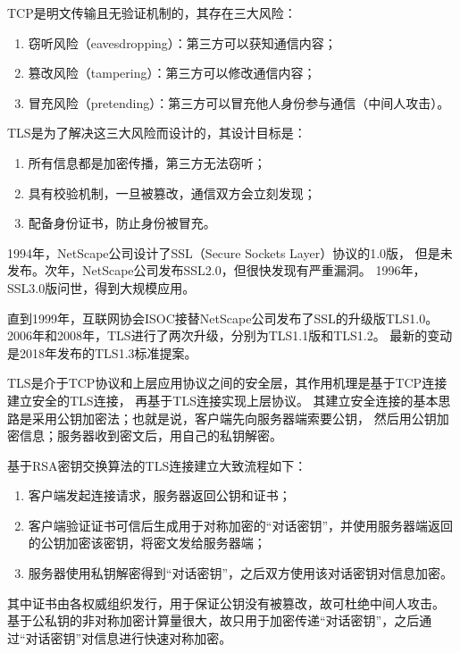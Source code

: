 TCP是明文传输且无验证机制的，其存在三大风险：

\begin{enumerate}
    \item 窃听风险（eavesdropping）：第三方可以获知通信内容；
    \item 篡改风险（tampering）：第三方可以修改通信内容；
    \item 冒充风险（pretending）：第三方可以冒充他人身份参与通信（中间人攻击）。
\end{enumerate}

TLS是为了解决这三大风险而设计的，其设计目标是：

\begin{enumerate}
    \item 所有信息都是加密传播，第三方无法窃听；
    \item 具有校验机制，一旦被篡改，通信双方会立刻发现；
    \item 配备身份证书，防止身份被冒充。
\end{enumerate}

1994年，NetScape公司设计了SSL（Secure Sockets Layer）协议的1.0版，
但是未发布。次年，NetScape公司发布SSL2.0，但很快发现有严重漏洞。
1996年，SSL3.0版问世，得到大规模应用。

直到1999年，互联网协会ISOC接替NetScape公司发布了SSL的升级版TLS1.0。
2006年和2008年，TLS进行了两次升级，分别为TLS1.1版和TLS1.2。
最新的变动是2018年发布的TLS1.3标准提案。

TLS是介于TCP协议和上层应用协议之间的安全层，其作用机理是基于TCP连接建立安全的TLS连接，
再基于TLS连接实现上层协议。
其建立安全连接的基本思路是采用公钥加密法；也就是说，客户端先向服务器端索要公钥，
然后用公钥加密信息；服务器收到密文后，用自己的私钥解密。

基于RSA密钥交换算法的TLS连接建立大致流程如下：

\begin{enumerate}
    \item 客户端发起连接请求，服务器返回公钥和证书；
    \item 客户端验证证书可信后生成用于对称加密的“对话密钥”，并使用服务器端返回的公钥加密该密钥，将密文发给服务器端；
    \item 服务器使用私钥解密得到“对话密钥”，之后双方使用该对话密钥对信息加密。
\end{enumerate}

其中证书由各权威组织发行，用于保证公钥没有被篡改，故可杜绝中间人攻击。
基于公私钥的非对称加密计算量很大，故只用于加密传递“对话密钥”，之后通过“对话密钥”对信息进行快速对称加密。

